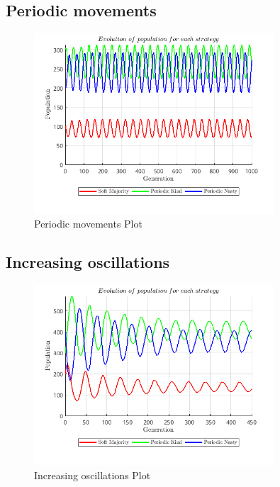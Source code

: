 \subsection{Periodic movements}
\begin{figure}[H]
    \centering
    \includegraphics[width=0.8\textwidth]{media/meetings/periodic_movements.png}
    \caption{Periodic movements Plot}
\end{figure}

\subsection{Increasing oscillations}
\begin{figure}[H]
    \centering
    \includegraphics[width=0.8\textwidth]{media/meetings/increasing_oscillations.png}
    \caption{Increasing oscillations Plot}
\end{figure}

